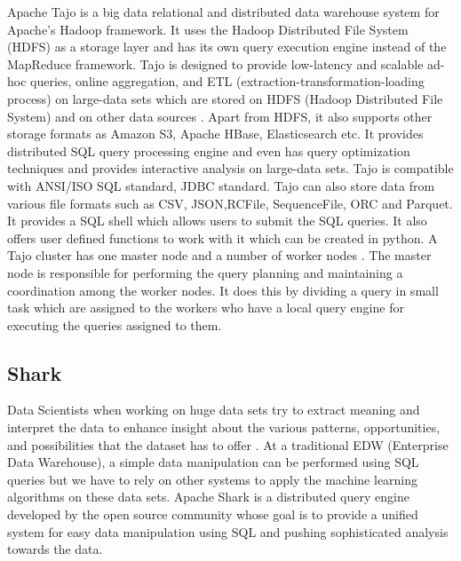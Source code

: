      Apache Tajo is a big data relational and
     distributed data warehouse system for Apache's Hadoop
     framework\cite{www-apache-tajo}. It uses the Hadoop Distributed
     File System (HDFS) as a
     storage layer and has its own query execution engine instead of
     the MapReduce framework. Tajo is designed to provide low-latency
     and scalable ad-hoc queries, online aggregation, and ETL
     (extraction-transformation-loading process) on large-data sets
     which are stored on HDFS (Hadoop Distributed File System) and on
     other data sources \cite{www-tutorialspoint-tajo}. Apart from HDFS,
     it also supports other storage formats as Amazon S3, Apache
     HBase, Elasticsearch etc. It provides distributed SQL query
     processing engine and even has query optimization techniques and
     provides interactive analysis on large-data sets. Tajo is
     compatible with ANSI/ISO SQL standard, JDBC standard. Tajo can
     also store data from various file formats such as CSV,
     JSON,RCFile, SequenceFile, ORC and Parquet. It provides a SQL
     shell which allows users to submit the SQL queries. It also
     offers user defined functions to work with it which can be
     created in python. A Tajo cluster has one master node and a
     number of worker nodes \cite{www-tutorialspoint-tajo}. The master
     node is responsible for performing the query planning and
     maintaining a coordination among the worker nodes. It does this
     by dividing a query in small task which are assigned to the
     workers who have a local query engine for executing the queries
     assigned to them.

     \pv
     

\subsection{Shark}

     Data Scientists when working on huge data sets try to extract
     meaning and interpret the data to enhance insight about the
     various patterns, opportunities, and possibilities that the
     dataset has to offer \cite{shark-paper-2012}. At a traditional
     EDW (Enterprise Data Warehouse), a simple data manipulation can
     be performed using SQL queries but we have to rely on other
     systems to apply the machine learning algorithms on these data
     sets. Apache Shark is a distributed query engine developed by the
     open source community whose goal is to provide a unified system
     for easy data manipulation using SQL and pushing sophisticated
     analysis towards the data.

